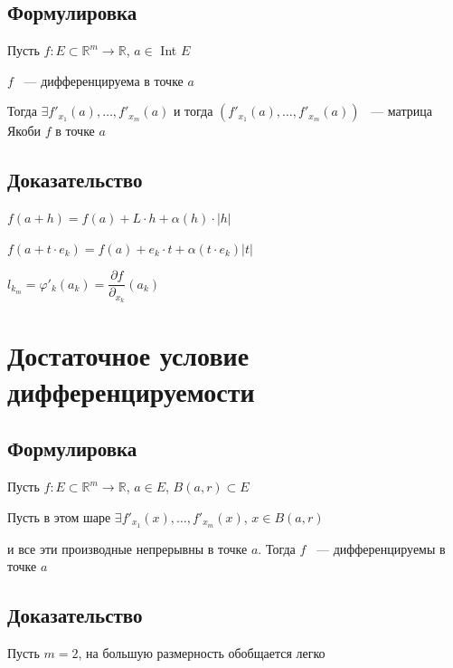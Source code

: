 \documentclass{article}
\begin{document}
        \subsection{Формулировка}
        
            Пусть $f : E \subset \mathbb{R}^m \rightarrow \mathbb{R}$, $a \in$ Int $E$
            
            $f$ ~--- дифференцируема в точке $a$
            
            Тогда $\exists f'_{x_1}(a), \ldots, f'_{x_m}(a)$ и тогда $(f'_{x_1}(a), \ldots, f'_{x_m}(a))$ ~--- матрица Якоби $f$ в точке $a$
            
        \subsection{Доказательство}
        
            $f(a + h) = f(a) + L \cdot h + \alpha(h) \cdot |h|$
            
            $f(a + t \cdot e_k) = f(a) + e_k \cdot t + \alpha(t \cdot e_k) |t|$
            
            $l_{k_m} = \varphi'_k (a_k) = \dfrac{\partial f}{\partial_{x_k}} (a_k)$
            
    \newpage
    
    \section{Достаточное условие дифференцируемости}
    
        \subsection{Формулировка}
        
            Пусть $f : E \subset \mathbb{R}^m \rightarrow \mathbb{R}$, $a \in E$, $B(a, r) \subset E$
            
            Пусть в этом шаре $\exists f'_{x_1} (x), \ldots, f'_{x_m} (x)$, $x \in B(a, r)$
            
            и все эти производные непрерывны в точке $a$. Тогда $f$ ~--- дифференцируемы в точке $a$
            
        \subsection{Доказательство}
        
            Пусть $m = 2$, на большую размерность обобщается легко
            
\end{document}
